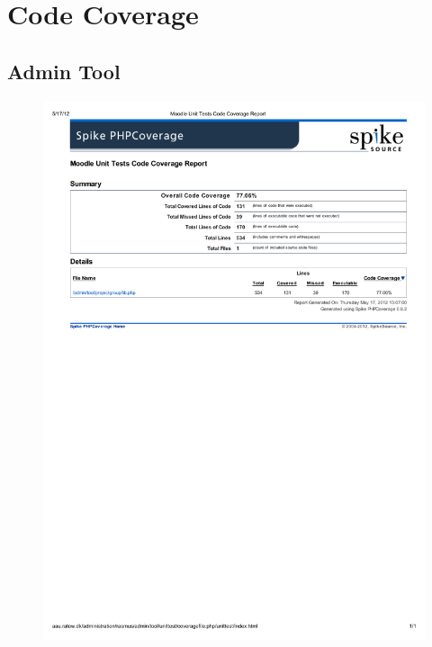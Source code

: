 \chapter{Code Coverage}
\section{Admin Tool}
\label{app:admincc}
\begin{figure}[h]
	\centering
		\includegraphics[trim=0cm 15cm 0cm 0cm,clip=true,width=\textwidth]{images/adminprojectgroupccreport.pdf}
	\label{fig:adminprojectgroupccreport}
\end{figure}

\pagebreak{}